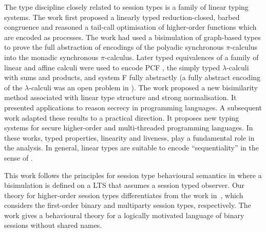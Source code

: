 The type discipline closely related
to session types is a family of linear typing systems. The
work \cite{LinearPi} first proposed a linearly typed reduction-closed, barbed congruence and 
reasoned a tail-call optimisation of higher-order functions which are
encoded 
as processes. 
The work \cite{Yoshida96} had
used a bisimulation of graph-based types to prove the full abstraction
of encodings of the polyadic synchronous $\pi$-calculus into the
monadic synchronous $\pi$-calculus. 
Later typed equivalences of a
family of linear and affine calculi \cite{BHY,DBLP:journals/iandc/YoshidaBH04,BergerHY05} 
were used to encode 
PCF \cite{Plotkin1977223,Milner19771}, the simply typed $\lambda$-calculi with sums and products, and system F \cite{GirardJY:protyp}
fully abstractly (a fully abstract encoding of the $\lambda$-calculi 
was an open problem in \cite{MilnerR:funp}).  
The work \cite{YHB02} proposed a new bisimilarity
method associated with linear type structure and strong
normalisation. It presented applications to reason secrecy in
programming languages. A subsequent work \cite{HY02} adapted these results
to a practical direction. It proposes new typing
systems for secure higher-order and multi-threaded programming 
languages. 
In these works, typed properties, linearity and liveness, 
play a fundamental role in the analysis. In general, linear types 
are suitable to encode ``sequentiality'' in the sense of 
\cite{HylandJME:fulapi,AbramskyS:fulap}.

This work follows the principles 
for
session type behavioural semantics in 
\cite{KYHH2015,KY2015,DBLP:journals/iandc/PerezCPT14}
where a bisimulation is defined on a LTS 
that assumes a session typed
observer.
Our theory for higher-order session types 
differentiates from 
the work in~\cite{KYHH2015,KY2015}, which 
considers the first-order
binary and multiparty session types, respectively.
The work \cite{DBLP:journals/iandc/PerezCPT14} gives a behavioural theory 
for a 
logically motivated
language of binary sessions 
without shared names.

